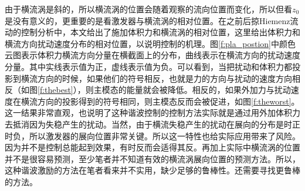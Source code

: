 由于横流涡是斜的，所以横流涡的位置会随着观察的流向位置而变化，所以但看$z_0$是没有意义的，更重要的是看激发器与横流涡的相对位置。在之前后掠Hiemenz流动的控制分析中，本文给出了施加体积力和横流涡的相对位置，这里给出体积力和横流方向扰动速度分布的相对位置，以说明控制的机理。图\ref{f:pla_postion}中颜色云图表示体积力横流方向分量在横截面上的分布，曲线表示在横流方向的扰动速度分量。其中实线表示值为正，虚线表示值为负。可以看到，当把扰动和体积力都投影到横流方向的时候，如果他们的符号相反，也就是力的方向与扰动的速度方向相反（如图\ref{f:thebest}），则主模态的能量就会被降低。相反的，如果外加力与扰动速度在横流方向的投影得到的符号相同，则主模态反而会被促进，如图\ref{f:theworst}。这一结果非常直观，也说明了这种谐波控制的控制方法实际就是通过用外加体积力去抵消因为失稳产生的扰动。当然，由于横流失稳产生的扰动在展向的分布是时正时负，所以激发器的展向位置非常关键。所以这一特性也给实际应用带来了风险。因为并不是控制总能起到效果，有时反而会适得其反。再加上实际中横流涡的位置并不是很容易预测，至少笔者并不知道有效的横流涡展向位置的预测方法。所以，这种谐波激励的方法在笔者看来并不实用，缺少足够的鲁棒性。还需要寻找更鲁棒的方法。

